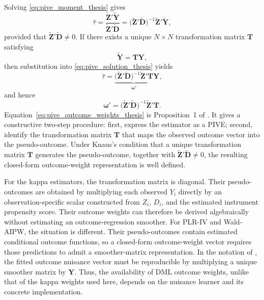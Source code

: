 \documentclass[12pt, a4paper, oneside]{article}
\theoremstyle{plain}
\theoremstyle{definition}
\begin{document}
Solving \eqref{eq:pive_moment_thesis} gives
\begin{equation}
    \widehat{\tau}
    =
    \frac{\widetilde{\mathbf Z}'\widetilde{\mathbf Y}}
         {\widetilde{\mathbf Z}'\widetilde{\mathbf D}}
    =
    \bigl(\widetilde{\mathbf Z}'\widetilde{\mathbf D}\bigr)^{-1}
      \widetilde{\mathbf Z}'\widetilde{\mathbf Y},
    \label{eq:pive_solution_thesis}
\end{equation}
provided that
\(\widetilde{\mathbf Z}'\widetilde{\mathbf D}\neq0\). If there exists a
unique \(N\times N\) transformation matrix \(\mathbf T\) satisfying
\begin{equation}
    \widetilde{\mathbf Y}=\mathbf T\mathbf Y,
    \label{eq:pive_transformation_thesis}
\end{equation}
then substitution into \eqref{eq:pive_solution_thesis} yields
\begin{equation}
    \widehat{\tau}
    =
    \underbrace{
      \bigl(\widetilde{\mathbf Z}'\widetilde{\mathbf D}\bigr)^{-1}
      \widetilde{\mathbf Z}'\mathbf T
    }_{\boldsymbol{\omega}'}
    \mathbf Y,
\end{equation}
and hence
\begin{equation}
    \boxed{
    \boldsymbol{\omega}'
    =
    \bigl(\widetilde{\mathbf Z}'\widetilde{\mathbf D}\bigr)^{-1}
    \widetilde{\mathbf Z}'\mathbf T.}
    \label{eq:pive_outcome_weights_thesis}
\end{equation}
Equation~\eqref{eq:pive_outcome_weights_thesis} is Proposition~1 of
\citet{knaus2024treatment}. It gives a constructive two-step procedure: first,
express the estimator as a PIVE; second, identify the transformation matrix
\(\mathbf T\) that maps the observed outcome vector into the pseudo-outcome.
Under Knaus's condition that a unique transformation matrix \(\mathbf T\)
generates the pseudo-outcome, together with
\(\widetilde{\mathbf Z}'\widetilde{\mathbf D}\neq0\), the resulting
closed-form outcome-weight representation is well defined.

For the kappa estimators, the transformation matrix is diagonal. Their
pseudo-outcomes are obtained by multiplying each observed \(Y_i\) directly by
an observation-specific scalar constructed from \(Z_i\), \(D_i\), and the
estimated instrument propensity score. Their outcome weights can therefore be
derived algebraically without estimating an outcome-regression smoother. For
PLR-IV and Wald-AIPW, the situation is different. Their pseudo-outcomes contain
estimated conditional outcome functions, so a closed-form outcome-weight vector
requires those predictions to admit a smoother-matrix representation. In the
notation of \citet{knaus2024treatment}, the fitted outcome nuisance vector must
be reproducible by multiplying a unique smoother matrix by \(\mathbf Y\). Thus,
the availability of DML outcome weights, unlike that of the kappa weights used
here, depends on the nuisance learner and its concrete implementation.
\end{document}
